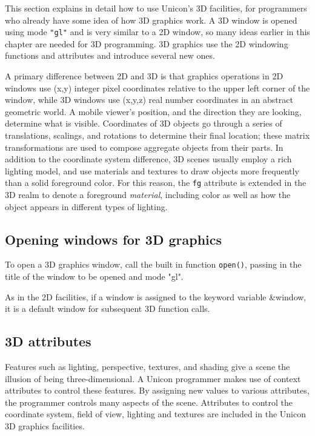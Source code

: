 This section explains in detail how to use Unicon's 3D facilities, for
programmers who already have some idea of how 3D graphics work. A 3D
window is opened using mode \texttt{"gl"} and is very similar to a 2D
window, so many ideas earlier in this chapter are needed for 3D
programming. 3D graphics use the 2D windowing functions and attributes
and introduce several new ones.

A primary difference between 2D and 3D is that graphics operations in
2D windows use (x,y) integer pixel coordinates relative to the upper
left corner of the window, while 3D windows use (x,y,z) real number
coordinates in an abstract geometric world. A mobile viewer's
position, and the direction they are looking, determine what is
visible. Coordinates of 3D objects go through a series of
translations, scalings, and rotations to determine their final
location; these matrix transformations are used to compose aggregate
objects from their parts. In addition to the coordinate system
difference, 3D scenes usually employ a rich lighting model, and use
materials and textures to draw objects more frequently than a solid
foreground color. For this reason, the \texttt{fg} attribute is
extended in the 3D realm to denote a foreground \textit{material},
including color as well as how the object appears in different types
of lighting.

\subsection{Opening windows for 3D graphics}

To open a 3D graphics window, call the built in function \texttt{open()},
passing in the title of the window to be opened and mode "gl".


\noindent
As in the 2D facilities, if a window is assigned to the keyword variable
\&window, it is a default window for subsequent 3D function calls. 

\subsection{3D attributes}

Features such as lighting, perspective, textures, and shading give a
scene the illusion of being three-dimensional. A Unicon programmer
makes use of context attributes to control these features. By
assigning new values to various attributes, the programmer controls
many aspects of the scene. Attributes to control the coordinate
system, field of view, lighting and textures are included in the
Unicon 3D graphics facilities.

